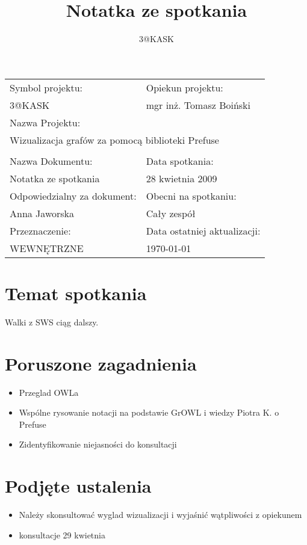 \documentclass[a4paper,10pt]{article}
\title{Notatka ze spotkania}
\author{3@KASK}
\begin{document}



\maketitle


\begin{center}
\begin{tabular}{|p{7cm}|p{7cm}|}
\hline
Symbol projektu: & Opiekun projektu:   \tabularnewline 
3@KASK & mgr inż. Tomasz Boiński    \tabularnewline \hline
\multicolumn{2}{|l|}{Nazwa Projektu: } \tabularnewline
\multicolumn{2}{|l|}{Wizualizacja grafów za pomocą biblioteki Prefuse } \tabularnewline 
\hline
\multicolumn{2}{l}{ } \tabularnewline %
\hline
Nazwa Dokumentu: & Data spotkania:   \tabularnewline 
Notatka ze spotkania & 28 kwietnia 2009 \tabularnewline \hline
Odpowiedzialny za dokument: & Obecni na spotkaniu:   \tabularnewline 
Anna Jaworska & Cały zespół \tabularnewline \hline
Przeznaczenie: & Data ostatniej aktualizacji:   \tabularnewline 
WEWNĘTRZNE & \today \tabularnewline \hline
\end{tabular}
\end{center}



\section{Temat spotkania}
Walki z SWS ciąg dalszy.

\section{Poruszone zagadnienia}
\begin{itemize}
 \item Przeglad OWLa 
\item  Wspólne rysowanie notacji na podstawie GrOWL i wiedzy Piotra K. o Prefuse 
\item  Zidentyfikowanie niejasności do konsultacji

\end{itemize}



\section{Podjęte ustalenia}
\begin{itemize}
 \item Należy skonsultować wyglad wizualizacji i wyjaśnić wątpliwości z opiekunem
 \item konsultacje 29 kwietnia
\end{itemize}




\newpage
\tableofcontents
\newpage


\clearpage
{}
{}

\end{document}
